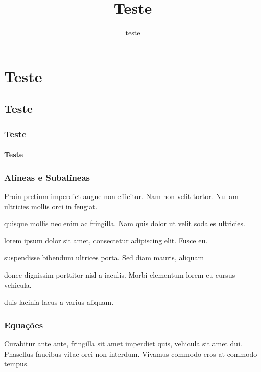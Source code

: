 \documentclass{uecetex2}
\title{Teste}
\author{teste}
\begin{document}
	
	\imprimirlistadefiguras
	\imprimirlistadetabelas
	\imprimirlistadequadros
	\imprimirsumario
	
	\chapter{Teste}	\lipsum[1]	
	\section{Teste}	\lipsum[1]
	\subsection{Teste}	\lipsum[1]
	\subsubsection{Teste}	\lipsum[1]
		\lipsum[1]
	
	\blindtext
	\subsection{Alíneas e Subalíneas}
	
	Proin pretium imperdiet augue non efficitur. Nam non velit tortor. Nullam ultricies mollis orci in feugiat.	
	
	\begin{alineas}
		\item quisque mollis nec enim ac fringilla. Nam quis dolor ut velit sodales ultricies.
		\item lorem ipsum dolor sit amet, consectetur adipiscing elit. Fusce eu.
		\begin{subalineas}
			\item suspendisse bibendum ultrices porta. Sed diam mauris, aliquam
			\item donec dignissim porttitor nisl a iaculis. Morbi elementum lorem eu cursus vehicula.
		\end{subalineas}
		\item duis lacinia lacus a varius aliquam. 
	\end{alineas}
	
	\subsection{Equações}

	Curabitur ante ante, fringilla sit amet imperdiet quis, vehicula sit amet dui. Phasellus faucibus vitae orci non interdum. Vivamus commodo eros at commodo tempus.
\end{document}
